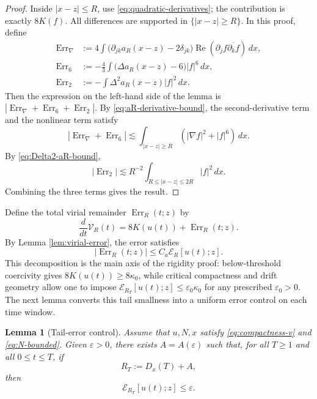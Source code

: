 \documentclass[10pt,a4paper]{amsart}
\numberwithin{equation}{section}
\newtheorem{lemma}[theorem]{Lemma}
\newcommand{\eps}{\varepsilon}
\newcommand{\Err}{\operatorname{Err}}
\begin{document}
\begin{proof}
Inside $|x-z|\le R$, use \eqref{eq:quadratic-derivatives}; the contribution is exactly $8K(f)$. All differences are supported in $\{|x-z|\ge R\}$. In this proof, define
\begin{align*}
  \Err_\nabla
  &:=4\int\bigl(\partial_{jk}a_R(x-z)-2\delta_{jk}\bigr)
       \operatorname{Re}(\partial_jf\overline{\partial_kf})\,dx,\\
  \Err_6
  &:=-\frac43\int\bigl(\Delta a_R(x-z)-6\bigr)|f|^6\,dx,\\
  \Err_2
  &:=-\int\Delta^2a_R(x-z)|f|^2\,dx.
\end{align*}
Then the expression on the left-hand side of the lemma is $|\Err_\nabla+\Err_6+\Err_2|$. By \eqref{eq:aR-derivative-bound}, the second-derivative term and the nonlinear term satisfy
\begin{equation*}
  |\Err_\nabla+\Err_6|
  \lesssim \int_{|x-z|\ge R}(|\nabla f|^2+|f|^6)\,dx.
\end{equation*}
By \eqref{eq:Delta2-aR-bound},
\begin{equation*}
  |\Err_2|
  \lesssim R^{-2}\int_{R\le|x-z|\le2R}|f|^2\,dx.
\end{equation*}
Combining the three terms gives the result.
\end{proof}

Define the total virial remainder $\operatorname{Err}_R(t;z)$ by
\begin{equation*}
  \frac{d}{dt}\mathcal V_R(t)=8K(u(t))+\operatorname{Err}_R(t;z).
\end{equation*}
By Lemma \ref{lem:virial-error}, the error satisfies
\begin{equation*}
  |\operatorname{Err}_R(t;z)|\le C_a\mathcal E_R[u(t);z].
\end{equation*}
This decomposition is the main axis of the rigidity proof: below-threshold coercivity gives $8K(u(t))\ge8\kappa_0$, while critical compactness and drift geometry allow one to impose $\mathcal E_{R_T}[u(t);z]\le\varepsilon_0\kappa_0$ for any prescribed $\varepsilon_0>0$. The next lemma converts this tail smallness into a uniform error control on each time window.

\begin{lemma}[Tail-error control]\label{lem:tail-error-control}
Assume that $u,N,x$ satisfy \eqref{eq:compactness-v} and \eqref{eq:N-bounded}. Given $\eps>0$, there exists $A=A(\eps)$ such that, for all $T\ge1$ and all $0\le t\le T$, if
\begin{equation*}
  R_T:=D_x(T)+A,
\end{equation*}
then
\begin{equation}\label{eq:ET-small}
  \mathcal E_{R_T}[u(t);z]\le\eps.
\end{equation}
\end{lemma}
\end{document}
